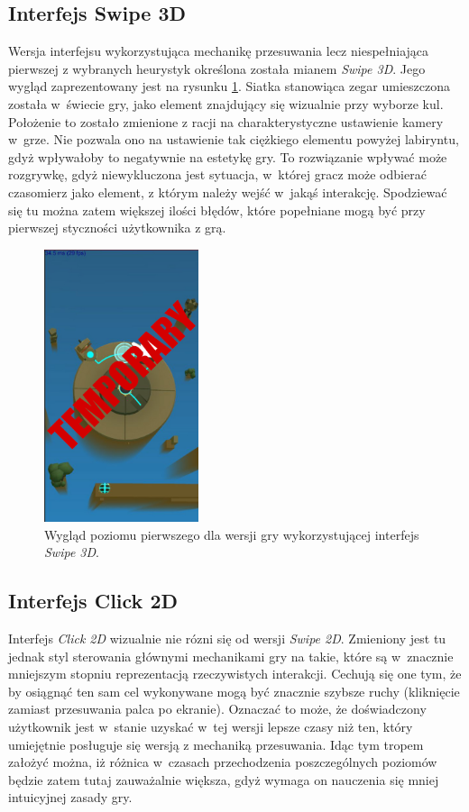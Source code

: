 \documentclass[a4paper,12pt,numbers=noenddot]{report}
\begin{document}
\subsection{Interfejs Swipe 3D}
Wersja interfejsu wykorzystująca mechanikę przesuwania lecz niespełniająca pierwszej z wybranych heurystyk określona została mianem \textit{Swipe 3D}. Jego wygląd zaprezentowany jest na rysunku \ref{fig:interface_Swipe_3d}. Siatka stanowiąca zegar umieszczona została w~świecie gry, jako element znajdujący się wizualnie przy wyborze kul. Położenie to zostało zmienione z racji na charakterystyczne ustawienie kamery w~grze. Nie pozwala ono na ustawienie tak ciężkiego elementu powyżej labiryntu, gdyż wpływałoby to negatywnie na estetykę gry. To rozwiązanie wpływać może rozgrywkę, gdyż niewykluczona jest sytuacja, w~której gracz może odbierać czasomierz jako element, z którym  należy wejść w~jakąś interakcję. Spodziewać się tu można zatem większej ilości błędów, które popełniane mogą być przy pierwszej styczności użytkownika z grą.
\begin{figure}[h!]
	\centering
  	\includegraphics[height=8cm]{fig/tmp.jpg}
	\caption{Wygląd poziomu pierwszego dla wersji gry wykorzystującej interfejs \textit{Swipe 3D}.}
	\label{fig:interface_Swipe_3d}
\end{figure}
\subsection{Interfejs Click 2D}
Interfejs \textit{Click 2D} wizualnie nie rózni się od wersji \textit{Swipe 2D}. Zmieniony jest tu jednak styl sterowania głównymi mechanikami gry na takie, które są w~znacznie mniejszym stopniu reprezentacją rzeczywistych interakcji. Cechują się one tym, że by osiągnąć ten sam cel wykonywane mogą być znacznie szybsze ruchy (kliknięcie zamiast przesuwania palca po ekranie). Oznaczać to może, że doświadczony użytkownik jest w~stanie uzyskać w~tej wersji lepsze czasy niż ten, który umiejętnie posługuje się wersją z mechaniką przesuwania. Idąc tym tropem założyć można, iż różnica w~czasach przechodzenia poszczególnych poziomów będzie zatem tutaj zauważalnie większa, gdyż wymaga on nauczenia się mniej intuicyjnej zasady gry.
\end{document}
